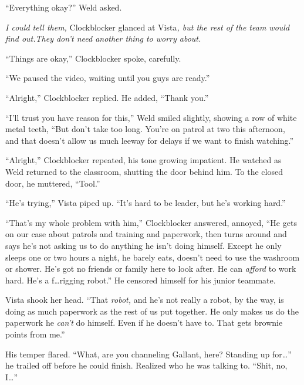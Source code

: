``Everything okay?'' Weld asked.



\emph{I could tell them, }Clockblocker glanced at Vista\emph{, but the rest of the team would find out.}\emph{They don't need another thing to worry about.}



``Things are okay,'' Clockblocker spoke, carefully.



``We paused the video, waiting until you guys are ready.''



``Alright,'' Clockblocker replied.  He added, ``Thank you.''



``I'll trust you have reason for this,'' Weld smiled slightly, showing a row of white metal teeth, ``But don't take too long.  You're on patrol at two this afternoon, and that doesn't allow us much leeway for delays if we want to finish watching.''



``Alright,'' Clockblocker repeated, his tone growing impatient.  He watched as Weld returned to the classroom, shutting the door behind him.  To the closed door, he muttered, ``Tool.''



``He's trying,'' Vista piped up.  ``It's hard to be leader, but he's working hard.''



``That's my whole problem with him,'' Clockblocker answered, annoyed, ``He gets on our case about patrols and training and paperwork, then turns around and says he's not asking us to do anything he isn't doing himself.  Except he only sleeps one or two hours a night, he barely eats, doesn't need to use the washroom or shower.  He's got no friends or family here to look after.  He can \emph{afford} to work hard.  He's a f\ldots{}rigging robot.''  He censored himself for his junior teammate.



Vista shook her head.  ``That \emph{robot, }and he's not really a robot, by the way, is doing as much paperwork as the rest of us put together.  He only makes us do the paperwork he \emph{can't} do himself.  Even if he doesn't have to.  That gets brownie points from me.''



His temper flared.  ``What, are you channeling Gallant, here?  Standing up for\ldots'' he trailed off before he could finish.  Realized who he was talking to.  ``Shit, no, I\ldots''



